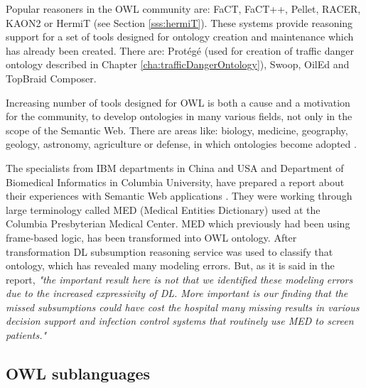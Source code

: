 Popular reasoners in the OWL community are: FaCT, FaCT++, Pellet, RACER, KAON2 or HermiT (see Section \ref{sss:hermiT}). These systems provide reasoning support for a set of tools designed for ontology creation and maintenance which has already been created. There are: Protégé (used for creation of traffic danger ontology described in Chapter \ref{cha:trafficDangerOntology}), Swoop, OilEd and TopBraid Composer.

Increasing number of tools designed for OWL is both a cause and a motivation for the community, to develop ontologies in many various fields, not only in the scope of the Semantic Web. There are areas like: biology, medicine, geography,
geology, astronomy, agriculture or defense, in which ontologies become adopted \cite{HLP08}.

The specialists from IBM departments in China and USA and Department of Biomedical Informatics in Columbia University, have prepared a report about their experiences with Semantic Web applications \cite{UCEReport}. They were working through large terminology called MED (Medical Entities Dictionary) used at the Columbia Presbyterian Medical Center. MED which previously had been using frame-based logic, has been transformed into OWL ontology. After transformation DL subsumption reasoning service was used to classify that ontology, which has revealed many modeling errors. But, as it is said in the report, \textit{"the important result here is not that we identified these modeling errors due to the increased expressivity of DL. More important is our finding that the missed subsumptions could have cost the hospital many missing results in various decision support and infection control systems that routinely use MED to screen patients."}

\subsection{OWL sublanguages}
\label{sub:owlSublanguages}

